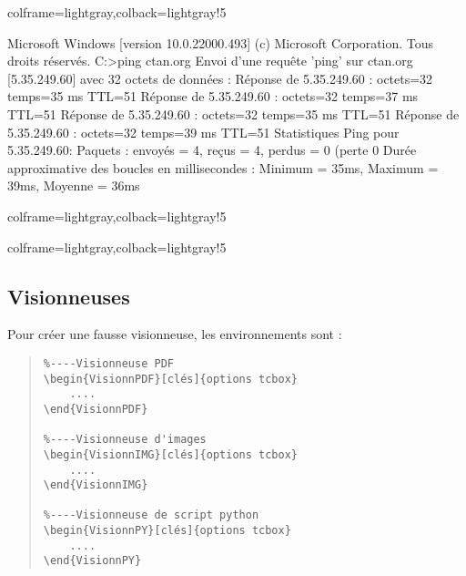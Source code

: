 \documentclass[11pt,a4paper]{ltxdoc}
\begin{document}
\begin{tcblisting}{colframe=lightgray,colback=lightgray!5}
\begin{TerminalWin}{}
Microsoft Windows [version 10.0.22000.493]
(c) Microsoft Corporation. Tous droits réservés.
C:\Users\test>ping ctan.org
Envoi d'une requête 'ping' sur ctan.org [5.35.249.60] avec 32 octets de données :
Réponse de 5.35.249.60 : octets=32 temps=35 ms TTL=51
Réponse de 5.35.249.60 : octets=32 temps=37 ms TTL=51
Réponse de 5.35.249.60 : octets=32 temps=35 ms TTL=51
Réponse de 5.35.249.60 : octets=32 temps=39 ms TTL=51
Statistiques Ping pour 5.35.249.60:
Paquets : envoyés = 4, reçus = 4, perdus = 0 (perte 0%
Durée approximative des boucles en millisecondes :
Minimum = 35ms, Maximum = 39ms, Moyenne = 36ms
\end{TerminalWin}
\end{tcblisting}

\begin{tcblisting}{colframe=lightgray,colback=lightgray!5}
\end{tcblisting}

\begin{tcblisting}{colframe=lightgray,colback=lightgray!5}
\end{tcblisting}

\pagebreak

\subsection{Visionneuses}

Pour créer une \og fausse\fg{} visionneuse, les environnements sont :

\begin{quote}
\begin{verbatim}
%----Visionneuse PDF
\begin{VisionnPDF}[clés]{options tcbox}
    ....
\end{VisionnPDF}

%----Visionneuse d'images
\begin{VisionnIMG}[clés]{options tcbox}
    ....
\end{VisionnIMG}

%----Visionneuse de script python
\begin{VisionnPY}[clés]{options tcbox}
    ....
\end{VisionnPY}
\end{verbatim}
\end{quote}
\end{document}

